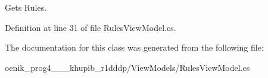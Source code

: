 Gets Rules. 



Definition at line 31 of file Rules\+View\+Model.\+cs.



The documentation for this class was generated from the following file\+:\begin{DoxyCompactItemize}
\item 
oenik\+\_\+prog4\+\_\+\_\+\_\+khupib\+\_\+r1dddp/\+View\+Models/Rules\+View\+Model.\+cs\end{DoxyCompactItemize}
